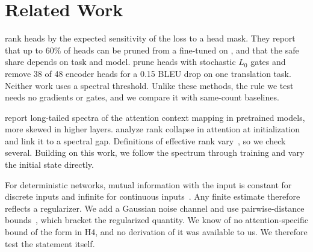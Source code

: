 \section{Related Work}
\label{sec:related}

 \citet{michel2019sixteen} rank heads by the expected sensitivity of the loss to a head mask. They report that up to 60\% of heads can be pruned from a fine-tuned \bert on \sst, and that the safe share depends on task and model. \citet{voita2019analyzing} prune heads with stochastic $L_0$ gates and remove 38 of 48 encoder heads for a 0.15 BLEU drop on one translation task. Neither work uses a spectral threshold. Unlike these methods, the rule we test needs no gradients or gates, and we compare it with same-count baselines.

 \citet{wang2020linformer} report long-tailed spectra of the attention context mapping in pretrained models, more skewed in higher layers. \citet{naitsaada2024mind} analyze rank collapse in attention at initialization and link it to a spectral gap. Definitions of effective rank vary~\citep{roy2007effective}, so we check several. Building on this work, we follow the spectrum through training and vary the initial state directly.

 For deterministic networks, mutual information with the input is constant for discrete inputs and infinite for continuous inputs~\citep{saxe2018information,goldfeld2019estimating}. Any finite estimate therefore reflects a regularizer. We add a Gaussian noise channel and use pairwise-distance bounds~\citep{kolchinsky2017estimating}, which bracket the regularized quantity. We know of no attention-specific bound of the form in H4, and no derivation of it was available to us. We therefore test the statement itself.
